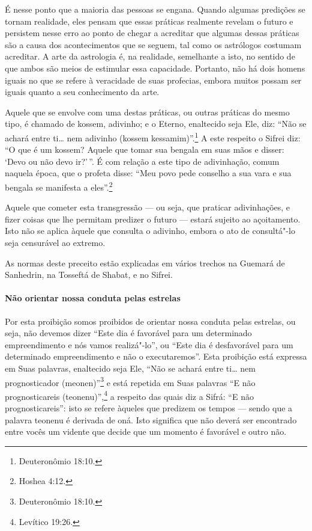 \begin{multicols}{2}
É nesse ponto que a maioria das pessoas se engana. Quando algumas
predições se tornam realidade, eles pensam que essas práticas realmente
revelam o futuro e persistem nesse erro ao ponto de chegar a acreditar
que algumas dessas práticas são a causa dos acontecimentos que se
seguem, tal como os astrólogos costumam acreditar. A arte da astrologia
é, na realidade, semelhante a isto, no sentido de que ambos são meios de
estimular essa capacidade. Portanto, não há dois homens iguais no que se refere à veracidade de suas
profecias, embora muitos possam ser iguais quanto a seu conhecimento da
arte.

Aquele que se envolve com uma destas práticas, ou outras práticas do
mesmo tipo, é chamado de kossem\starr, adivinho; e o Eterno, enaltecido
seja Ele, diz: ``Não se achará entre ti\ldots{} nem adivinho (kossem
kessamim\starr)''.\footnote{Deuteronômio 18:10.} A este respeito o Sifrei\starr{} diz: ``O que
é um kossem\starr? Aquele que tomar sua bengala em suas mãos e disser: `Devo
ou não devo ir?'\,''. É com relação a este tipo de adivinhação, comum
naquela época, que o profeta disse: ``Meu povo pede conselho a sua vara
e sua bengala se manifesta a eles''.\footnote{Hoshea 4:12.}

Aquele que cometer esta transgressão --- ou seja, que praticar
adivinhações, e fizer coisas que lhe permitam predizer o futuro ---
estará sujeito ao açoitamento. Isto não se aplica àquele que consulta o
adivinho, embora o ato de consultá"-lo seja censurável ao extremo.

As normas deste preceito estão explicadas em vários trechos na Guemará\starr{}
de Sanhedrin\starr, na Tosseftá\starr{} de Shabat, e no Sifrei\starr.

\paragraph{Não orientar nossa conduta pelas estrelas}

Por esta proibição somos proibidos de orientar nossa conduta pelas
estrelas, ou seja, não devemos dizer ``Este dia é favorável para um
determinado empreendimento e nós vamos realizá"-lo'', ou ``Este dia é
desfavorável para um determinado empreendimento e não o executaremos''.
Esta proibição está expressa em Suas palavras, enaltecido seja Ele,
``Não se achará entre ti\ldots{} nem prognosticador (meonen\starr)''\footnote{Deuteronômio
18:10.} e está repetida em Suas palavras ``E não prognosticareis
(teonenu\starr)'',\footnote{Levítico 19:26.} a respeito das quais diz a Sifrá\starr: ``E não
prognosticareis'': isto se refere àqueles que predizem os tempos ---
sendo que a palavra teonenu\starr{} é derivada de oná\starr. Isto significa que não deverá ser encontrado entre vocês
um vidente que decide que um momento é favorável e outro não.


\end{multicols}
